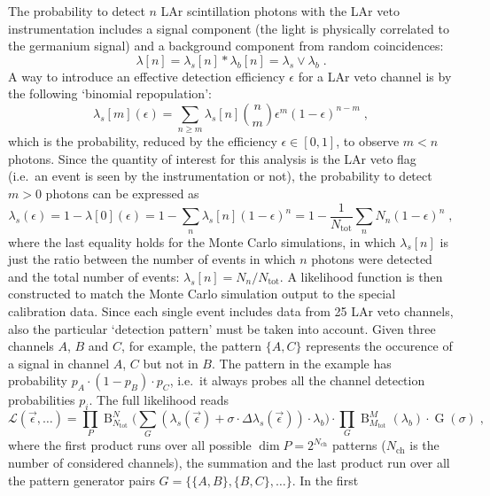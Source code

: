 The probability to detect $n$ LAr scintillation photons with the LAr veto instrumentation
includes a signal component (the light is physically correlated to the germanium signal)
and a background component from random coincidences:
\[
  \lambda[n] = \lambda_s[n] * \lambda_b[n] = \lambda_s \vee \lambda_b \;.
\]
A way to introduce an effective detection efficiency $\epsilon$ for a LAr veto channel is
by the following `binomial repopulation':
\[
  \lambda_s[m](\epsilon) = \sum_{n \geq m} \lambda_s[n] \binom{n}{m} \epsilon^m
    {(1-\epsilon)}^{n-m} \;,
\]
which is the probability, reduced by the efficiency $\epsilon \in [0,1]$, to observe $m <
n$ photons. Since the quantity of interest for this analysis is the LAr veto flag (i.e.~an
event is seen by the instrumentation or not), the probability to detect $m > 0$ photons
can be expressed as
\[
  \lambda_s(\epsilon) = 1 - \lambda[0](\epsilon)
                      = 1 - \sum_n \lambda_s[n] {(1-\epsilon)}^n
                      = 1 - \frac{1}{N_\text{tot}} \sum_n N_n {(1-\epsilon)}^n \;,
\]
where the last equality holds for the Monte Carlo simulations, in which $\lambda_s[n]$ is
just the ratio between the number of events in which $n$ photons were detected and the
total number of events: $\lambda_s[n] = N_n / N_\text{tot}$.
\newpar
A likelihood function is then constructed to match the Monte Carlo simulation output to the
special calibration data. Since each single event includes data from 25 LAr veto channels,
also the particular `detection pattern' must be taken into account. Given three channels
$A$, $B$ and $C$, for example, the pattern $\{A,C\}$ represents the occurence of a signal
in channel $A$, $C$ but not in $B$. The pattern in the example has probability $p_A
\cdot (1-p_B) \cdot p_C$, i.e.~it always probes all the channel detection probabilities
$p_i$. The full likelihood reads
\begin{equation}\label{eq:bkg:lar:ph2:pca-likelihood}
  \mathcal{L}(\vec{\epsilon}, \ldots) =
    \prod_P \operatorname{B}_{N_\text{tot}}^N \big(
      \sum_G ( \lambda_s(\vec{\epsilon}) + \sigma \cdot \Delta\lambda_s(\vec{\epsilon})) \cdot
      \lambda_b \big)
    \cdot \prod_G \operatorname{B}_{M_\text{tot}}^M (\lambda_b) \cdot
    \operatorname{G}(\sigma) \;,
\end{equation}
where the first product runs over all possible $\dim{P} = 2^{N_\text{ch}}$ patterns
($N_\text{ch}$ is the number of considered channels), the summation and the last product
run over all the pattern generator pairs $G = \{\{A,B\},\{B,C\},\ldots\}$. In the first
